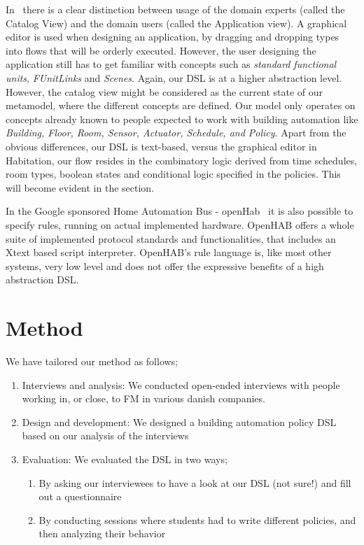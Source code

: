 \documentclass{llncs}
\begin{document}
In~\cite{habitation} there is a clear distinction between usage of the domain experts (called the Catalog View) and the domain users (called the Application view). A graphical editor is used when designing an application, by dragging and dropping types into flows that will be orderly executed. However, the user designing the application still has to get familiar with concepts such as \textit{standard functional units}, \textit{FUnitLinks} and \textit{Scenes}. Again, our DSL is at a higher abstraction level. However, the catalog view might be considered as the current state of our metamodel, where the different concepts are defined. Our model only operates on concepts already known to people expected to work with building automation like \textit{Building, Floor, Room, Sensor, Actuator, Schedule, and Policy}. Apart from the obvious differences, our DSL is text-based, versus the graphical editor in Habitation, our flow resides in the combinatory logic derived from time schedules, room types, boolean states and conditional logic specified in the policies. This will become evident in the  section.

In the Google sponsored Home Automation Bus - openHab~\cite{openhab} it is also possible to specify rules, running on actual implemented hardware. OpenHAB offers a whole suite of implemented protocol standards and functionalities, that includes an Xtext based script interpreter. OpenHAB's rule language is, like most other systems, very low level and does not offer the expressive benefits of a high abstraction DSL.

\section{Method}\label{sec:method}
We have tailored our method as follows;

\begin{enumerate}
	\item Interviews and analysis: We conducted open-ended interviews with people working in, or close, to FM in various danish companies.
	\item Design and development: We designed a building automation policy DSL based on our analysis of the interviews
	\item Evaluation: We evaluated the DSL in two ways;
	\begin{enumerate}
		\item By asking our interviewees to have a look at our DSL (not sure!) and fill out a questionnaire
		\item By conducting sessions where students had to write different policies, and then analyzing their behavior
	\end{enumerate}
\end{enumerate}
\end{document}

